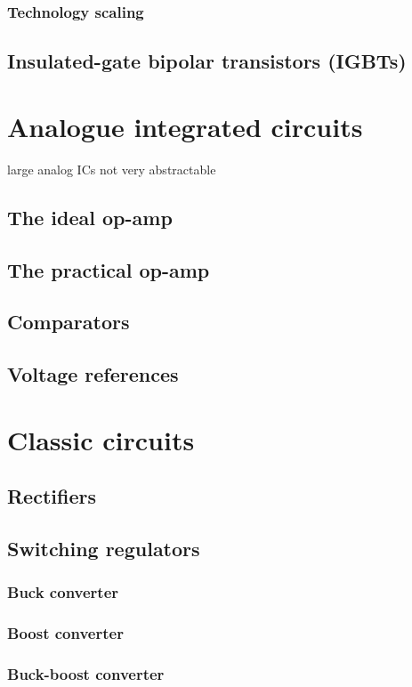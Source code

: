 \documentclass{report}
\begin{document}
\subsection{Technology scaling}



\section{Insulated-gate bipolar transistors (IGBTs)}

\chapter{Analogue integrated circuits}
large analog ICs not very abstractable
\section{The ideal op-amp}
\section{The practical op-amp}
\section{Comparators}
\section{Voltage references}

\chapter{Classic circuits}
\section{Rectifiers}
\section{Switching regulators}
\subsection{Buck converter}
\subsection{Boost converter}
\subsection{Buck-boost converter}
\end{document}
